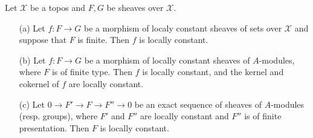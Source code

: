 \begin{lemma}\label{topos locally constant sheaf morphism prop}
Let $\mathcal{X}$ be a topos and $F,G$ be sheaves over $\mathcal{X}$.
\begin{enumerate}
    \item[(a)] Let $f:F\to G$ be a morphism of localy constant sheaves of sets over $\mathcal{X}$ and suppose that $F$ is finite. Then $f$ is locally constant.
    \item[(b)] Let $f:F\to G$ be a morphism of locally constant sheaves of $A$-modules, where $F$ is of finite type. Then $f$ is locally constant, and the kernel and cokernel of $f$ are locally constant.
    \item[(c)] Let $0\to F'\to F\to F''\to 0$ be an exact sequence of sheaves of $A$-modules (resp. groups), where $F'$ and $F''$ are locally constant and $F''$ is of finite presentation. Then $F$ is locally constant.
\end{enumerate}
\end{lemma}
